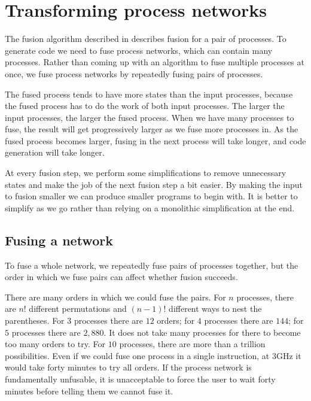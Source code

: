 \section{Transforming process networks}

The fusion algorithm described in  describes fusion for a pair of processes.
To generate code we need to fuse process networks, which can contain many processes.
Rather than coming up with an algorithm to fuse multiple processes at once, we fuse process networks by repeatedly fusing pairs of processes.

The fused process tends to have more states than the input processes, because the fused process has to do the work of both input processes.
The larger the input processes, the larger the fused process.
When we have many processes to fuse, the result will get progressively larger as we fuse more processes in.
As the fused process becomes larger, fusing in the next process will take longer, and code generation will take longer.


At every fusion step, we perform some simplifications to remove unnecessary states and make the job of the next fusion step a bit easier.
By making the input to fusion smaller we can produce smaller programs to begin with.
It is better to simplify as we go rather than relying on a monolithic simplification at the end.

\subsection{Fusing a network}
To fuse a whole network, we repeatedly fuse pairs of processes together, but the order in which we fuse pairs can affect whether fusion succeeds.


There are many orders in which we could fuse the pairs.
For $n$ processes, there are $n!$ different permutations and $(n-1)!$ different ways to nest the parentheses.
For $3$ processes there are $12$ orders; for $4$ processes there are $144$; for $5$ processes there are $2,880$.
It does not take many processes for there to become too many orders to try.
For $10$ processes, there are more than a trillion possibilities.
Even if we could fuse one process in a single instruction, at 3GHz it would take forty minutes to try all orders.
If the process network is fundamentally unfusable, it is unacceptable to force the user to wait forty minutes before telling them we cannot fuse it.

